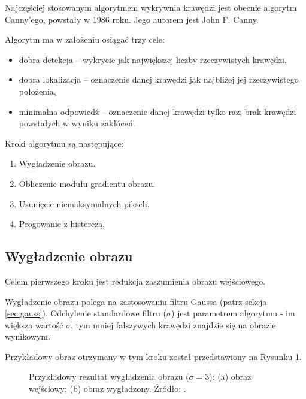 \documentclass[a4paper,twocolumn,12pt]{article}
\begin{document}
Najczęściej stosowanym algorytmem wykrywnia krawędzi jest obecnie algorytm Canny'ego, powstały w 1986 roku.
Jego autorem jest John F. Canny.

Algorytm ma w założeniu osiągać trzy cele:
\begin{itemize}
 \item dobra detekcja – wykrycie jak największej liczby rzeczywistych krawędzi,
 \item dobra lokalizacja – oznaczenie danej krawędzi jak najbliżej jej rzeczywistego położenia,
 \item minimalna odpowiedź – oznaczenie danej krawędzi tylko raz; brak krawędzi powstałych w wyniku zakłóceń.
\end{itemize}

Kroki algorytmu są następujące:
\begin{enumerate}
 \item Wygładzenie obrazu.
 \item Obliczenie modułu gradientu obrazu.
 \item Usunięcie niemaksymalnych pikseli.
 \item Progowanie z histerezą.
\end{enumerate}


\subsection{Wygładzenie obrazu}

Celem pierwszego kroku jest redukcja zaszumienia obrazu wejściowego.

Wygładzenie obrazu polega na zastosowaniu filtru Gaussa (patrz sekcja \ref{sec:gauss}).
Odchylenie standardowe filtru ($\sigma$) jest parametrem algorytmu - im większa wartość $\sigma$, tym mniej fałszywych krawędzi znajdzie się na obrazie wynikowym.

Przykładowy obraz otrzymany w tym kroku został przedstawiony na Rysunku \ref{fig:canny_smoothing}.

\begin{figure}[!ht]
 \begin{center}
 \end{center}
 \caption{
  Przykładowy rezultat wygładzenia obrazu ($\sigma = 3$):
  (a) obraz wejściowy;
  (b) obraz wygładzony.
  Źródło: \cite{boldak}.
 }
 \label{fig:canny_smoothing}
\end{figure}
\end{document}
